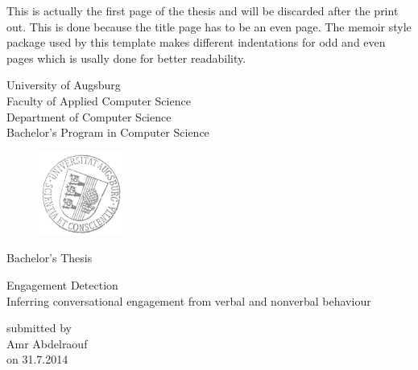 \documentclass[12pt, a4paper, fleqn]{memoir}%
\begin{document}
\frontmatter

\pagestyle{empty}
This is actually the first page of the thesis and will be discarded after the print out. This is done because 
the title page has to be an even page. The memoir style package used by this template makes different indentations 
for odd and even pages which is usally done for better readability.  
\clearpage

\pagestyle{empty}
\rmfamily
\noindent
\begin{center}
University of Augsburg\\
Faculty of Applied Computer Science\\
Department of Computer Science\\
Bachelor's Program in Computer Science\\
\end{center}
\begin{figure}[h!]
\centering
\includegraphics[width=0.25\textwidth]{logo.png}
\end{figure}
\vfill\vfill
\begin{center}
\Large
Bachelor's Thesis\\
\end{center}
\vspace{2.0em}
\begin{center}
\Large
\LARGE Engagement Detection\\ \vspace{10pt} 
\Large Inferring conversational engagement from verbal and nonverbal behaviour
\end{center}
\vspace{2.0em}
\begin{center}
    \normalsize
    submitted by\\
    \large
    Amr Abdelraouf\\
    \normalsize
    on 31.7.2014
\end{center}
\end{document}
